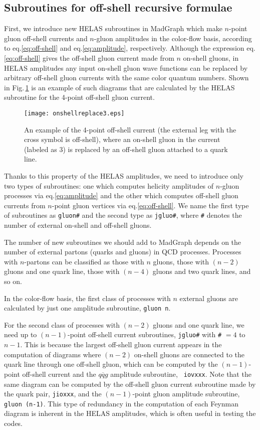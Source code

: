 \documentclass[a4paper,11pt]{article}
\begin{document}
\subsection{Subroutines for off-shell recursive formulae}
First, we introduce new HELAS\cite{HELAS} subroutines in MadGraph which make
  $n$-point gluon off-shell currents and $n$-gluon amplitudes in the color-flow basis, according to
 eq.\eqref{eq:off-shell} and eq.\eqref{eq:amplitude},
  respectively. Although the expression eq.\eqref{eq:off-shell} gives
  the off-shell gluon current made from $n$
  on-shell gluons, in HELAS amplitudes any input on-shell gluon wave
  functions can be replaced by arbitrary off-shell gluon currents with the same
  color quantum numbers. Shown in
  Fig.\,\ref{fig:replace} is an
  example of such diagrams that are calculated by the HELAS subroutine for the
  4-point off-shell gluon current.
\begin{figure}
\begin{center}
\texttt{[image: onshellreplace3.eps]}
\caption{An example of the 4-point off-shell
 current (the external leg with the cross symbol is off-shell), where an
 on-shell gluon in the current (labeled as 3) is replaced by an off-shell gluon attached to
 a quark line.}
\label{fig:replace}
\end{center}
\end{figure}
Thanks to this property of the HELAS
  amplitudes, we need to introduce only two types of subroutines: one which computes
   helicity amplitudes of $n$-gluon processes via
  eq.\eqref{eq:amplitude} and the other which computes off-shell gluon
  currents from $n$-point gluon vertices via eq.\eqref{eq:off-shell}. We
  name the first type of subroutines as {\tt gluon\#} and the second
  type as
  {\tt jgluo\#}, where {\tt \#} denotes the number of external on-shell
  and off-shell gluons.

The number of new subroutines we should
  add to MadGraph depends on the number of external partons (quarks and
  gluons) in QCD
  processes. Processes with $n$-partons can be classified as those
  with $n$ gluons, those with $(n-2)$ gluons and one quark line, those
  with $(n-4)$ gluons and two quark lines, and so on.

In the color-flow basis,
  the first class of processes with $n$ external gluons are calculated
  by just one amplitude subroutine, {\tt gluon\,n}.

For the
  second class of processes with $(n-2)$ gluons and one quark line, we
  need up to $(n-1)$-point off-shell current subroutines, {\tt jgluo\#}
  with {\tt \#} $=4$ to $n-1$. This is because the largest off-shell
  gluon current appears in the computation of diagrams where $(n-2)$ on-shell gluons are connected to
  the quark line through one off-shell gluon, which can be computed by the $(n-1)$-point off-shell
  current and the $q\overline{q}g$ amplitude subroutine, {\tt
  iovxxx}. Note that the same diagram can be computed by the off-shell
  gluon current subroutine made by the quark pair, {\tt jioxxx}, and the
  $(n-1)$-point gluon amplitude subroutine, {\tt gluon\,(n-1)}. This
  type of redundancy in the computation of each Feynman diagram is
  inherent in the HELAS amplitudes, which is often useful in testing the
  codes.
\end{document}
